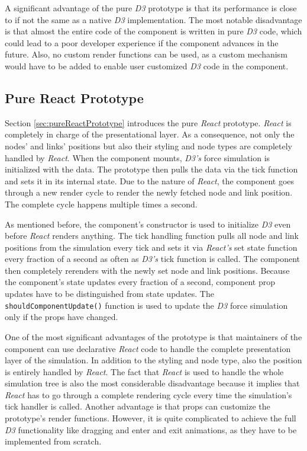 A significant advantage of the pure \emph{D3} prototype is that its performance is close to if not the same as a native \emph{D3} implementation. The most notable disadvantage is that almost the entire code of the component is written in pure \emph{D3} code, which could lead to a poor developer experience if the component advances in the future. Also, no custom render functions can be used, as a custom mechanism would have to be added to enable user customized \emph{D3} code in the component. 

\subsection{Pure React Prototype}

Section \ref{sec:pureReactPrototype} introduces the pure \emph{React} prototype. \emph{React} is completely in charge of the presentational layer. As a consequence, not only the nodes' and links' positions but also their styling and node types are completely handled by \emph{React}. When the component mounts, \emph{D3's} force simulation is initialized with the data. The prototype then pulls the data via the tick function and sets it in its internal state. Due to the nature of \emph{React}, the component goes through a new render cycle to render the newly fetched node and link position. The complete cycle happens multiple times a second.

As mentioned before, the component's constructor is used to initialize \emph{D3} even before \emph{React} renders anything. The tick handling function pulls all node and link positions from the simulation every tick and sets it via \emph{React's} set state function every fraction of a second as often as \emph{D3's} tick function is called. The component then completely rerenders with the newly set node and link positions. Because the component's state updates every fraction of a second, component prop updates have to be distinguished from state updates. The \texttt{shouldComponentUpdate()} function is used to update the \emph{D3} force simulation only if the props have changed.

One of the most significant advantages of the prototype is that maintainers of the component can use declarative \emph{React} code to handle the complete presentation layer of the simulation. In addition to the styling and node type, also the position is entirely handled by \emph{React}. The fact that \emph{React} is used to handle the whole simulation tree is also the most considerable disadvantage because it implies that \emph{React} has to go through a complete rendering cycle every time the simulation's tick handler is called. Another advantage is that props can customize the prototype's render functions. However, it is quite complicated to achieve the full \emph{D3} functionality like dragging and enter and exit animations, as they have to be implemented from scratch. 


